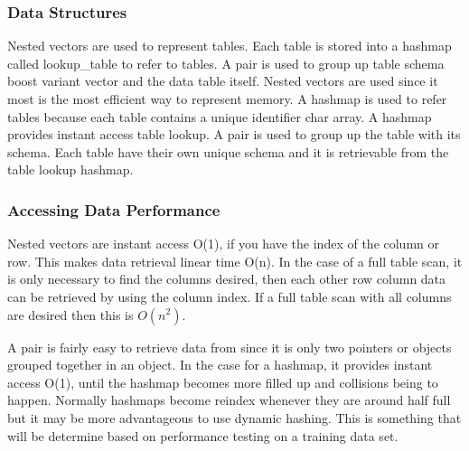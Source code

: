\documentclass[letterpaper, 12pt]{article}
\begin{document}
\subsubsection{Data Structures}
	Nested vectors are used to represent tables. Each table is stored into a hashmap called lookup{\_}table to refer to
	tables. A pair is used to group up table schema boost variant vector and the data table itself. Nested vectors
	are used since it most is the most efficient way to represent memory. A hashmap is used to refer tables because each
	table contains a unique identifier char array. A hashmap provides instant access table lookup. A pair is used to group
	up the table with its schema. Each table have their own unique schema and it is retrievable from the table lookup hashmap.

\subsubsection{Accessing Data Performance}
	Nested vectors are instant access O(1), if you have the index of the column or row. This makes data retrieval
	linear time O(n). In the case of a full table scan, it is only necessary to find the columns desired, then each other row
	column data can be retrieved by using the column index. If a full table scan with all columns are desired then this is $O(n^2)$. 
	\par\vspace{\baselineskip}
	A pair is fairly easy to retrieve data from since it is only two pointers or objects grouped together in an object. In the case for a hashmap, it provides instant access O(1), until the hashmap becomes more filled up and collisions being to happen. Normally hashmaps become reindex whenever they are around half full but it may be more advantageous to use dynamic hashing. This is something that will be determine based on performance testing on a training data set.

\newpage
\end{document}

